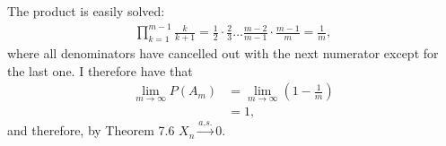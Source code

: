 \begin{problem}{20}
The product is easily solved:
\begin{align*}  
\prod_{k=1}^{m-1}\frac{k}{k+1} = \frac{1}{2} \cdot \frac{2}{3}\ldots \frac{m-2}{m-1} \cdot \frac{m-1}{m} = \frac{1}{m},
\end{align*}
where all denominators have cancelled out with the next numerator except for the last one.  I therefore have that
\begin{align*}
\lim_{m \rightarrow \infty}P(A_m) & = \lim_{m \rightarrow \infty}\left(1-\frac{1}{m} \right)\\
& = 1,
\end{align*}
and therefore, by Theorem 7.6 $X_n \xrightarrow{a.s.} 0$.



\end{problem}